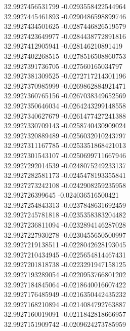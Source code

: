 {32.9927456531799	-0.0293558422544964\\
32.9927445461893	-0.0290486598899746\\
32.9927434501625	-0.0287446826519579\\
32.9927423649977	-0.0284438772891816\\
32.9927412905941	-0.028146210891419\\
32.9927402268515	-0.0278516508860753\\
32.9927391736705	-0.027560165034797\\
32.9927381309525	-0.0272717214301196\\
32.9927370985999	-0.0269862884921471\\
32.9927360765156	-0.0267038349652569\\
32.9927350646034	-0.0264243299148558\\
32.9927340627679	-0.0261477427241388\\
32.9927330709143	-0.0258740430909024\\
32.9927320889489	-0.0256032010243797\\
32.9927311167785	-0.0253351868421013\\
32.9927301543107	-0.0250699711667946\\
32.9927292014539	-0.0248075249233137\\
32.9927282581173	-0.0245478193355841\\
32.9927273242108	-0.0242908259235958\\
32.992726399645	-0.024036516500421\\
32.9927254843313	-0.0237848631692459\\
32.9927245781818	-0.0235358383204482\\
32.9927236811094	-0.0232894146287028\\
32.9927227930278	-0.0230455650500997\\
32.9927219138511	-0.0228042628193045\\
32.9927210434945	-0.0225654814467431\\
32.9927201818738	-0.0223291947158125\\
32.9927193289054	-0.0220953766801202\\
32.9927184845064	-0.0218640016607422\\
32.9927176485949	-0.0216350442435232\\
32.9927168210894	-0.0214084792763887\\
32.9927160019091	-0.0211842818666957\\
32.9927151909742	-0.0209624273785959\\
}
